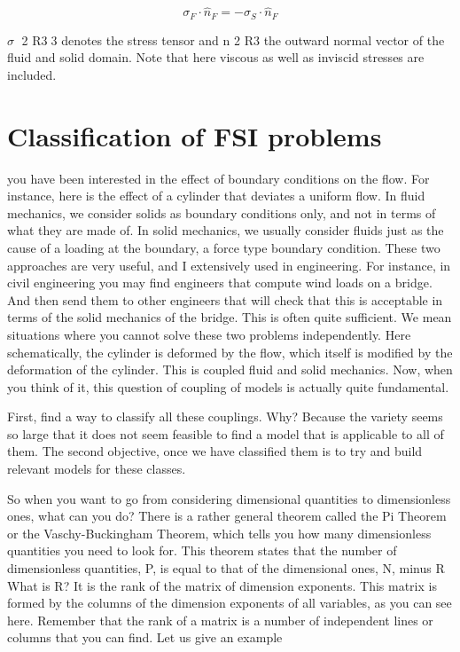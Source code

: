 \begin{equation}
\sigma_F \cdot \hat{n}_F = -\sigma_S \cdot \hat{n}_F
\end{equation}

$\sigma $ 2 R33 denotes the stress tensor and n 2 R3 the outward normal vector of the fluid and solid domain.
Note that here viscous as well as inviscid stresses are included.

\section{Classification of FSI problems}

you have been interested in the effect of boundary conditions on the flow. For instance, here is the effect of a cylinder that deviates a uniform flow. In fluid mechanics, we consider solids as boundary conditions only,
and not in terms of what they are made of.
In solid mechanics, we usually consider fluids just as the cause of a loading at the boundary, a force type boundary condition. These two approaches are very useful, and I extensively used in engineering. For instance, in civil engineering you may find engineers that compute wind loads on a bridge. And then send them to other engineers that will check that this is acceptable in terms of the solid mechanics of the bridge. This is often quite sufficient.
We mean situations where you cannot solve these two problems independently.
Here schematically, the cylinder is deformed by the flow, which itself is modified by the deformation of the cylinder. This is coupled fluid and solid mechanics. Now, when you think of it, this question of coupling of models is actually quite fundamental.

First, find a way to classify all these couplings. Why? Because the variety seems so large that it does not seem feasible to find a model that is applicable to all of them. The second objective, once we have classified them is to try and build relevant models for these classes.

So when you want to go from considering dimensional quantities to dimensionless ones, what can you do?
There is a rather general theorem called the Pi Theorem or the Vaschy-Buckingham Theorem, which tells you how many dimensionless quantities you need to look for.
This theorem states that the number of dimensionless quantities, P, is equal to that of the dimensional ones, N, minus R
What is R? It is the rank of the matrix of dimension exponents. This matrix is formed by the columns of the dimension exponents of all variables, as you can see here. Remember that the rank of a matrix is a number of independent lines or columns that you can find. Let us give an example


